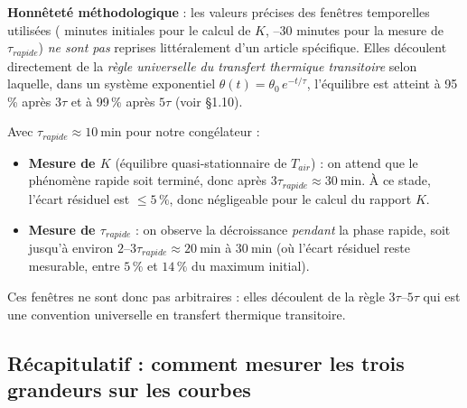 \documentclass[11pt,a4paper]{article}
\begin{document}
\begin{honnete}
\textbf{Honnêteté méthodologique} : les valeurs précises des fenêtres temporelles utilisées
( minutes initiales \fg{} pour le calcul de $K$, --30 minutes \fg{} pour la
mesure de $\tau_{rapide}$) \emph{ne sont pas} reprises littéralement d'un article
spécifique. Elles découlent directement de la \emph{règle universelle du transfert
thermique transitoire} selon laquelle, dans un système exponentiel $\theta(t) = \theta_0
\,e^{-t/\tau}$, l'équilibre est atteint à 95\,\% après $3\tau$ et à 99\,\% après $5\tau$
(voir \S1.10).

Avec $\tau_{rapide} \approx \SI{10}{\minute}$ pour notre congélateur :
\begin{itemize}[itemsep=2pt]
\item \textbf{Mesure de $K$} (équilibre quasi-stationnaire de $T_{air}$) : on attend que
le phénomène rapide soit terminé, donc après $3\tau_{rapide} \approx \SI{30}{\minute}$.
À ce stade, l'écart résiduel est $\le 5\,\%$, donc négligeable pour le calcul du rapport $K$.
\item \textbf{Mesure de $\tau_{rapide}$} : on observe la décroissance \emph{pendant} la
phase rapide, soit jusqu'à environ $2$--$3\tau_{rapide} \approx \SI{20}{\minute}$ à
$\SI{30}{\minute}$ (où l'écart résiduel reste mesurable, entre $5\,\%$ et $14\,\%$ du
maximum initial).
\end{itemize}

Ces fenêtres ne sont donc pas arbitraires : elles découlent de la règle $3\tau$--$5\tau$
qui est une convention universelle en transfert thermique transitoire.
\end{honnete}

\subsection{Récapitulatif : comment mesurer les trois grandeurs sur les courbes}
\end{document}
